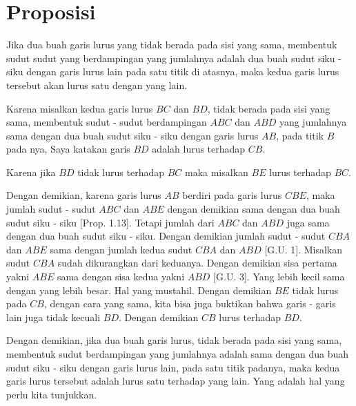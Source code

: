 \documentclass[a4paper]{book}
\begin{document}
\section*{\centering Proposisi \thesection} 

Jika dua buah garis lurus yang tidak berada pada sisi yang sama, membentuk
sudut sudut yang berdampingan yang jumlahnya adalah dua buah sudut siku - siku
dengan garis lurus lain pada satu titik di atasnya, maka kedua garis lurus tersebut 
akan lurus satu dengan yang lain.

\begin{center}
\end{center}

Karena misalkan kedua garis lurus $BC$ dan $BD$, tidak berada pada sisi yang sama,
membentuk sudut - sudut berdampingan $ABC$ dan $ABD$ yang jumlahnya sama dengan
dua buah sudut siku - siku dengan garis lurus $AB$, pada titik $B$ pada nya, Saya
katakan garis $BD$ adalah lurus terhadap $CB$.

Karena jika $BD$ tidak lurus terhadap $BC$ maka misalkan $BE$ lurus
terhadap $BC$. 

Dengan demikian, karena garis lurus $AB$ berdiri pada garis lurus $CBE$, maka 
jumlah sudut - sudut $ABC$ dan $ABE$ dengan demikian sama dengan dua buah 
sudut siku - siku [Prop. 1.13]. Tetapi jumlah dari $ABC$ dan $ABD$ juga sama
dengan dua buah sudut siku - siku. Dengan demikian jumlah sudut - sudut $CBA$
dan $ABE$ sama dengan jumlah kedua sudut $CBA$ dan $ABD$ [G.U. 1]. Misalkan 
sudut $CBA$ sudah dikurangkan dari keduanya. Dengan demikian sisa pertama 
yakni $ABE$ sama dengan sisa kedua yakni $ABD$
 [G.U. 3]. Yang lebih kecil sama
dengan yang lebih besar. Hal yang mustahil. Dengan demikian $BE$ tidak lurus pada
$CB$, dengan cara yang sama, kita bisa juga buktikan bahwa garis - garis lain
juga tidak kecuali $BD$. Dengan demikian $CB$ lurus terhadap $BD$.

Dengan demikian, jika dua buah garis lurus, tidak berada pada sisi yang sama, 
membentuk sudut berdampingan yang jumlahnya adalah sama dengan dua buah sudut
siku - siku dengan garis lurus lain, pada satu titik padanya, maka kedua
garis lurus tersebut adalah lurus satu terhadap yang lain. Yang adalah hal yang
perlu kita tunjukkan.  
\end{document}

